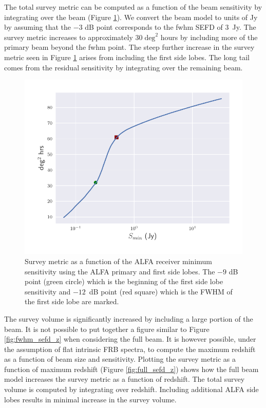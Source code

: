 \documentclass[a4paper,fleqn,usenatbib]{mnras}
\begin{document}
The total survey metric can be computed as a function of the beam sensitivity by
integrating over the beam (Figure \ref{fig:survey_metric_sense}). We convert the
beam model to units of Jy by assuming that the $-3$ dB point corresponds to the
\gls{fwhm} SEFD of 3~Jy. The survey metric increases to approximately $30 \;
\textrm{deg}^2$ hours by including more of the primary beam beyond the
\gls{fwhm} point. The steep further increase in the survey metric seen in Figure
\ref{fig:survey_metric_sense} arises from including the first side lobes. The
long tail comes from the residual sensitivity by integrating over the remaining
beam.

\begin{figure}
    \includegraphics[width=1.0\linewidth]{figures/full_survey_metric_sense.pdf}
    \caption{Survey metric as a function of the ALFA receiver minimum
    sensitivity using the ALFA primary and first side lobes. The $-9$ dB point
    (green circle) which is the beginning of the first side lobe sensitivity and
    $-12$~dB point (red square) which is the FWHM of the first side lobe are
    marked.
    }
    \label{fig:survey_metric_sense}
\end{figure}

The survey volume is significantly increased by including a large portion of the
beam. It is not possible to put together a figure similar to Figure
\ref{fig:fwhm_sefd_z} when considering the full beam. It is however possible,
under the assumption of flat intrinsic FRB spectra, to compute the maximum
redshift as a function of beam size and sensitivity. Plotting the survey metric
as a function of maximum redshift (Figure \ref{fig:full_sefd_z}) shows how the
full beam model increases the survey metric as a function of redshift. The total
survey volume is computed by integrating over redshift.  Including additional
ALFA side lobes results in minimal increase in the survey volume.
\end{document}
